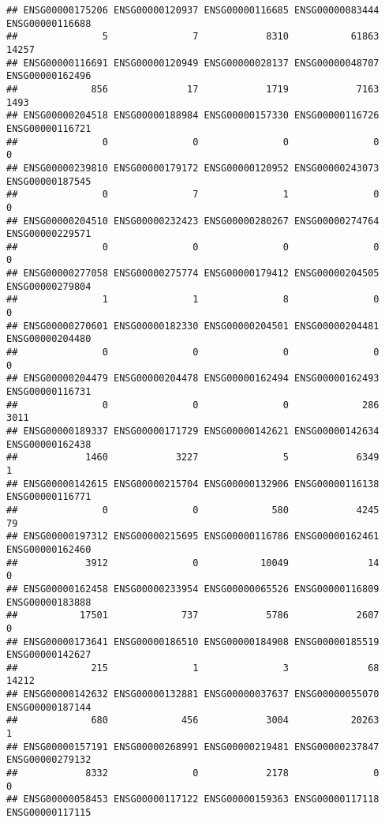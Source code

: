 \documentclass[
]{article}
\begin{document}
\begin{verbatim}
## ENSG00000175206 ENSG00000120937 ENSG00000116685 ENSG00000083444 ENSG00000116688 
##               5               7            8310           61863           14257 
## ENSG00000116691 ENSG00000120949 ENSG00000028137 ENSG00000048707 ENSG00000162496 
##             856              17            1719            7163            1493 
## ENSG00000204518 ENSG00000188984 ENSG00000157330 ENSG00000116726 ENSG00000116721 
##               0               0               0               0               0 
## ENSG00000239810 ENSG00000179172 ENSG00000120952 ENSG00000243073 ENSG00000187545 
##               0               7               1               0               0 
## ENSG00000204510 ENSG00000232423 ENSG00000280267 ENSG00000274764 ENSG00000229571 
##               0               0               0               0               0 
## ENSG00000277058 ENSG00000275774 ENSG00000179412 ENSG00000204505 ENSG00000279804 
##               1               1               8               0               0 
## ENSG00000270601 ENSG00000182330 ENSG00000204501 ENSG00000204481 ENSG00000204480 
##               0               0               0               0               0 
## ENSG00000204479 ENSG00000204478 ENSG00000162494 ENSG00000162493 ENSG00000116731 
##               0               0               0             286            3011 
## ENSG00000189337 ENSG00000171729 ENSG00000142621 ENSG00000142634 ENSG00000162438 
##            1460            3227               5            6349               1 
## ENSG00000142615 ENSG00000215704 ENSG00000132906 ENSG00000116138 ENSG00000116771 
##               0               0             580            4245              79 
## ENSG00000197312 ENSG00000215695 ENSG00000116786 ENSG00000162461 ENSG00000162460 
##            3912               0           10049              14               0 
## ENSG00000162458 ENSG00000233954 ENSG00000065526 ENSG00000116809 ENSG00000183888 
##           17501             737            5786            2607               0 
## ENSG00000173641 ENSG00000186510 ENSG00000184908 ENSG00000185519 ENSG00000142627 
##             215               1               3              68           14212 
## ENSG00000142632 ENSG00000132881 ENSG00000037637 ENSG00000055070 ENSG00000187144 
##             680             456            3004           20263               1 
## ENSG00000157191 ENSG00000268991 ENSG00000219481 ENSG00000237847 ENSG00000279132 
##            8332               0            2178               0               0 
## ENSG00000058453 ENSG00000117122 ENSG00000159363 ENSG00000117118 ENSG00000117115 

\end{verbatim}
\end{document}
